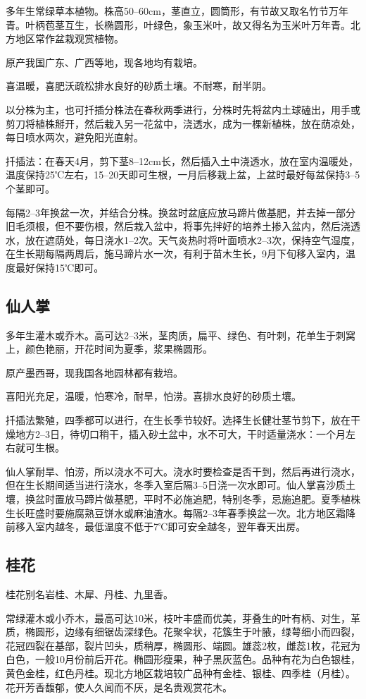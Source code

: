 \documentclass{ctexbook}
\begin{document}
多年生常绿草本植物。株高50--60cm，茎直立，圆筒形，有节故又取名竹节万年青。叶柄苞茎互生，长椭圆形，叶绿色，象玉米叶，故又得名为玉米叶万年青。北方地区常作盆栽观赏植物。

原产我国广东、广西等地，现各地均有栽培。

喜温暖，喜肥沃疏松排水良好的砂质土壤。不耐寒，耐半阴。

以分株为主，也可扦插分株法在春秋两季进行，分株时先将盆内土球磕出，用手或剪刀将植株掰开，然后栽入另一花盆中，浇透水，成为一棵新植株，放在荫凉处，每日喷水两次，避免阳光直射。

扦插法：在春天4月，剪下茎8--12cm长，然后插入土中浇透水，放在室内温暖处，温度保持25℃左右，15--20天即可生根，一月后移栽上盆，上盆时最好每盆保持3--5个茎即可。

每隔2--3年换盆一次，并结合分株。换盆时盆底应放马蹄片做基肥，并去掉一部分旧毛须根，但不要伤根，然后栽入盆中，将事先拌好的培养土掺入盆内，然后浇透水，放在遮荫处，每日浇水1--2次。天气炎热时将叶面喷水2--3次，保持空气湿度，在生长期每隔两周后，施马蹄片水一次，有利于苗木生长，9月下旬移入室内，温度最好保持15℃即可。
\subsection{仙人掌}
多年生灌木或乔木。高可达2--3米，茎肉质，扁平、绿色、有叶刺，花单生于刺窝上，颜色艳丽，开花时间为夏季，浆果椭圆形。

原产墨西哥，现我国各地园林都有栽培。

喜阳光充足，温暖，怕寒冷，耐旱，怕涝。喜排水良好的砂质土壤。

扦插法繁殖，四季都可以进行，在生长季节较好。选择生长健壮茎节剪下，放在干燥地方2--3日，待切口稍干，插入砂土盆中，水不可大，干时适量浇水：一个月左右就可生根。

仙人掌耐旱、怕涝，所以浇水不可大。浇水时要检查是否干到，然后再进行浇水，但在生长期间适当进行浇水，冬季入室后隔3--5日浇一次水即可。仙人掌喜沙质土壤，换盆时置放马蹄片做基肥，平时不必施追肥，特别冬季，忌施追肥。夏季植株生长旺盛时要施腐熟豆饼水或麻油渣水。每隔2--3年春季换盆一次。北方地区霜降前移入室内越冬，最低温度不低于7℃即可安全越冬，翌年春天出房。
\subsection{桂花}
桂花别名岩桂、木犀、丹桂、九里香。

常绿灌木或小乔木，最高可达10米，枝叶丰盛而优美，芽叠生的叶有柄、对生，革质，椭圆形，边缘有细锯齿深绿色。花聚伞状，花簇生于叶腋，绿萼细小而四裂，花冠四裂在基部，裂片凹头，质稍厚，椭圆形、端圆。雄蕊2枚，雌蕊1枚，花冠为白色，一般10月份前后开花。椭圆形瘦果，种子黑灰蓝色。品种有花为白色银桂，黄色金桂，红色丹桂。现北方地区栽培较广品种有金桂、银桂、四季桂（月桂）。花开芳香馥郁，使人久闻而不厌，是名贵观赏花木。
\end{document}
